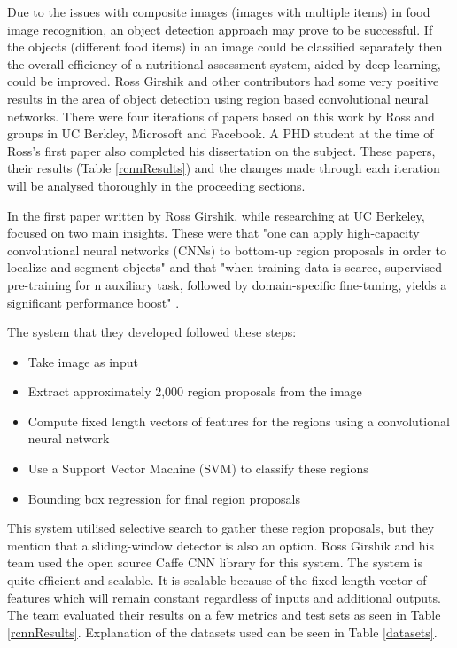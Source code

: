 Due to the issues with composite images (images with multiple items) in food image recognition, an object detection approach may prove to be successful.
If the objects (different food items) in an image could be classified separately then the overall efficiency of a nutritional assessment system, aided by deep learning, could be improved.
Ross Girshik and other contributors had some very positive results in the area
of object detection using region based convolutional neural networks. There were
four iterations of papers based on this work by Ross and groups in UC Berkley,
Microsoft and Facebook. A PHD student at the time of Ross's first paper also
completed his dissertation on the subject. These papers, their
results (Table \ref{rcnnResults}) and the changes made through each iteration will be analysed thoroughly in the proceeding sections.

In the first paper written by Ross Girshik, while researching at UC Berkeley,
focused on two main insights. These were that "one can apply high-capacity convolutional neural networks (CNNs) to bottom-up region proposals in order to localize and segment objects" and that
"when training data is scarce, supervised pre-training for n auxiliary task,
followed by domain-specific fine-tuning, yields a significant performance boost"
\parencite{rcnn}.

The system that they developed followed these steps:
\begin{itemize}
    \item{Take image as input}
    \item{Extract approximately 2,000 region proposals from the image}
    \item{Compute fixed length vectors of features for the regions using a convolutional
        neural network}
    \item{Use a Support Vector Machine (SVM) to classify these regions}
    \item{Bounding box regression for final region proposals}
\end{itemize}

This system utilised selective search to gather these region proposals, but they
mention that a sliding-window detector is also an option. Ross Girshik and his
team used the open source Caffe CNN library for this system. The system is quite
efficient and scalable. It is scalable because of the fixed length vector of
features which will remain constant regardless of inputs and additional outputs.
The team evaluated their results on a few metrics and test sets as seen in Table
\ref{rcnnResults}. Explanation of the datasets used can be seen in Table \ref{datasets}.

